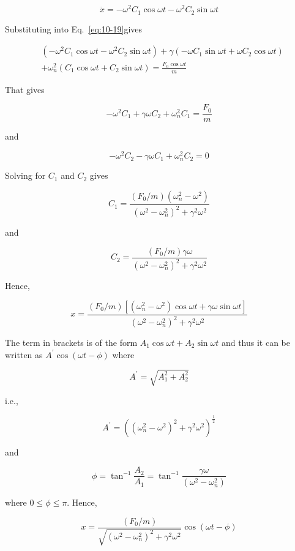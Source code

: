 \documentclass[10pt]{article}
\numberwithin{equation}{section}
\begin{document}
$$
\ddot{x}=-\omega^{2} C_{1} \cos \omega t-\omega^{2} C_{2} \sin \omega t
$$

Substituting into Eq.~\eqref{eq:10-19}gives

$$
\begin{aligned}
& \left(-\omega^{2} C_{1} \cos \omega t-\omega^{2} C_{2} \sin \omega t\right)+\gamma\left(-\omega C_{1} \sin \omega t+\omega C_{2} \cos \omega t\right) \\
& +\omega_{n}^{2}\left(C_{1} \cos \omega t+C_{2} \sin \omega t\right)=\frac{F_{0} \cos \omega t}{m}
\end{aligned}
$$

That gives

$$
-\omega^{2} C_{1}+\gamma \omega C_{2}+\omega_{n}^{2} C_{1}=\frac{F_{0}}{m}
$$

and

$$
-\omega^{2} C_{2}-\gamma \omega C_{1}+\omega_{n}^{2} C_{2}=0
$$

Solving for $C_{1}$ and $C_{2}$ gives

$$
C_{1}=\frac{\left(F_{0} / m\right)\left(\omega_{n}^{2}-\omega^{2}\right)}{\left(\omega^{2}-\omega_{n}^{2}\right)^{2}+\gamma^{2} \omega^{2}}
$$

and

$$
C_{2}=\frac{\left(F_{0} / m\right) \gamma \omega}{\left(\omega^{2}-\omega_{n}^{2}\right)^{2}+\gamma^{2} \omega^{2}}
$$

Hence,

$$
x=\frac{\left(F_{0} / m\right)\left[\left(\omega_{n}^{2}-\omega^{2}\right) \cos \omega t+\gamma \omega \sin \omega t\right]}{\left(\omega^{2}-\omega_{n}^{2}\right)^{2}+\gamma^{2} \omega^{2}}
$$

The term in brackets is of the form $A_{1} \cos \omega t+A_{2} \sin \omega t$ and thus it can be written as $A^{\prime} \cos (\omega t-\phi)$ where

$$
A^{\prime}=\sqrt{A_{1}^{2}+A_{2}^{2}}
$$

i.e.,

$$
A^{\prime}=\left(\left(\omega_{n}^{2}-\omega^{2}\right)^{2}+\gamma^{2} \omega^{2}\right)^{\frac{1}{2}}
$$

and

$$
\phi=\tan ^{-1} \frac{A_{2}}{A_{1}}=\tan ^{-1} \frac{\gamma \omega}{\left(\omega^{2}-\omega_{n}^{2}\right)}
$$

where $0 \leq \phi \leq \pi$. Hence,


\begin{equation}
x=\frac{\left(F_{0} / m\right)}{\sqrt{\left(\omega^{2}-\omega_{n}^{2}\right)^{2}+\gamma^{2} \omega^{2}}} \cos (\omega t-\phi) \label{eq:10-22}
\end{equation}
\end{document}
